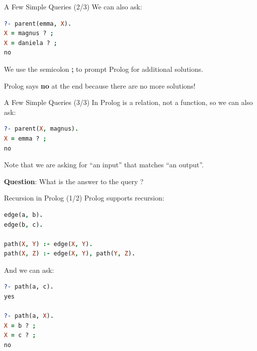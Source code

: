 \begin{frame}[fragile]{A Few Simple Queries (2/3)}
We can also ask:

\begin{lstlisting}[language=prolog, xleftmargin=0.5cm]
?- parent(emma, X).
X = magnus ? ;
X = daniela ? ;
no
\end{lstlisting}

We use the semicolon \textbf{;} to prompt Prolog for additional solutions.

Prolog says \textbf{no} at the end because there are no more solutions!
\end{frame}

\begin{frame}[fragile]{A Few Simple Queries (3/3)}
In Prolog  is a relation, not a function, so we can also ask:

\begin{lstlisting}[language=prolog, xleftmargin=0.5cm]
?- parent(X, magnus).
X = emma ? ;
no
\end{lstlisting}

Note that we are asking for ``an input'' that matches ``an output''.

\pause

\textbf{Question}: What is the answer to the query ?
\end{frame}

\begin{frame}[fragile]{Recursion in Prolog (1/2)}
Prolog supports recursion:

\begin{lstlisting}[language=prolog, xleftmargin=0.5cm]
edge(a, b).
edge(b, c).

path(X, Y) :- edge(X, Y).
path(X, Z) :- edge(X, Y), path(Y, Z).
\end{lstlisting}

\pause

And we can ask:

\begin{lstlisting}[language=prolog, xleftmargin=0.5cm]
?- path(a, c).
yes

?- path(a, X).
X = b ? ;
X = c ? ;
no
\end{lstlisting}
\end{frame}

